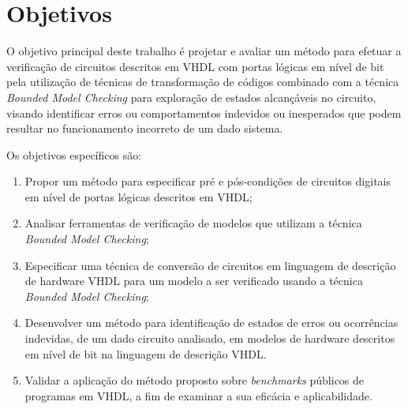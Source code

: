 \section{Objetivos}

O objetivo principal deste trabalho é projetar e avaliar um método para efetuar a verificação de circuitos
descritos em VHDL com portas lógicas em nível de bit pela utilização de técnicas de transformação de códigos combinado com a técnica \textit{Bounded Model Checking} para exploração de estados alcançáveis no circuito, visando identificar erros ou comportamentos indevidos ou inesperados que podem resultar no funcionamento incorreto de um dado sistema.

Os objetivos específicos são:
\begin{enumerate}
  \item Propor um método para especificar pré e pós-condições de circuitos digitais em nível de portas lógicas descritos em VHDL;
  \item Analisar ferramentas de verificação de modelos que utilizam a técnica \textit{Bounded Model Checking};
  \item Especificar uma técnica de conversão de circuitos em linguagem de descrição de hardware VHDL para um modelo a ser verificado usando a técnica \textit{Bounded Model Checking};
   \item Desenvolver um método para identificação de estados de erros ou ocorrências indevidas, de um dado circuito analisado, em modelos de hardware descritos em nível de bit na linguagem de descrição VHDL.
  \item Validar a aplicação do método proposto sobre \textit{benchmarks} públicos de programas em VHDL, a fim de examinar a sua eficácia e aplicabilidade.
\end{enumerate}


